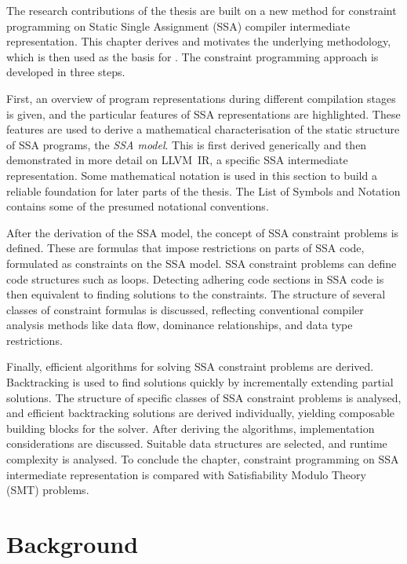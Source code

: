 
    The research contributions of the thesis are built on a new method for
    constraint programming on Static Single Assignment (SSA) compiler
    intermediate representation.
    This chapter derives and motivates the underlying methodology, which is
    then used as the basis for
    .
    The constraint programming approach is developed in three steps.

    First, an overview of program representations during different compilation
    stages is given, and the particular features of SSA representations are
    highlighted.
    These features are used to derive a mathematical characterisation of
    the static structure of SSA programs, the {\it SSA model}.
    This is first derived generically and then demonstrated
    in more detail on \mbox{LLVM IR}, a specific SSA intermediate
    representation.
    Some mathematical notation is used in this section to build a reliable
    foundation for later parts of the thesis.
    The List of Symbols and Notation contains some of the presumed notational
    conventions.

    After the derivation of the SSA model, the concept of SSA constraint
    problems is defined.
    These are formulas that impose restrictions on parts of SSA code,
    formulated as constraints on the SSA model.
    SSA constraint problems can define code structures such as loops.
    Detecting adhering code sections in SSA code is then equivalent to finding
    solutions to the constraints.
    The structure of several classes of constraint formulas is discussed,
    reflecting conventional compiler analysis methods like data flow,
    dominance relationships, and data type restrictions.

    Finally, efficient algorithms for solving SSA constraint problems are
    derived.
    Backtracking is used to find solutions quickly by incrementally extending
    partial solutions.
    The structure of specific classes of SSA constraint problems is analysed,
    and efficient backtracking solutions are derived individually, yielding
    composable building blocks for the solver.
    After deriving the algorithms, implementation considerations are
    discussed.
    Suitable data structures are selected, and runtime complexity is analysed.
    To conclude the chapter, constraint programming on SSA intermediate
    representation is compared with Satisfiability Modulo Theory (SMT) problems.

\section{Background}

